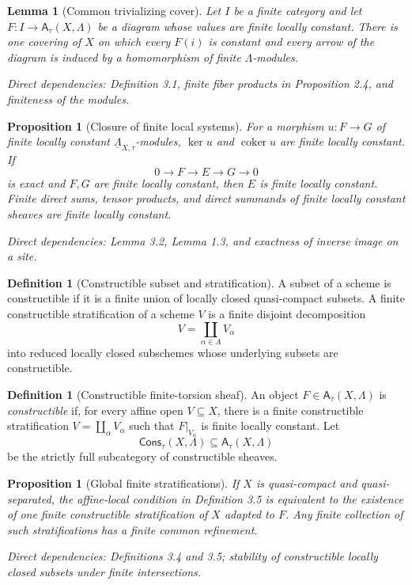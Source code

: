 \documentclass[10pt]{article}
\newtheorem{proposition}[theorem]{Proposition}
\newtheorem{lemma}[theorem]{Lemma}
\theoremstyle{definition}
\newtheorem{definition}[theorem]{Definition}
\newcommand{\Lam}{\Lambda}
\newcommand{\Cons}{\mathsf{Cons}}
\newcommand{\dep}[1]{\par\smallskip\noindent\textit{Direct dependencies: #1}}
\begin{document}
\begin{lemma}[Common trivializing cover]
Let $I$ be a finite category and let $F:I\to\mathsf A_\tau(X,\Lam)$ be a
diagram whose values are finite locally constant.  There is one covering of
$X$ on which every $F(i)$ is constant and every arrow of the diagram is
induced by a homomorphism of finite $\Lam$-modules.
\dep{Definition 3.1, finite fiber products in Proposition 2.4, and finiteness
of the modules.}
\end{lemma}

\begin{proposition}[Closure of finite local systems]
For a morphism $u:F\to G$ of finite locally constant
$\underline\Lam_{X,\tau}$-modules, $\ker u$ and $\operatorname{coker}u$ are
finite locally constant.  If
\[
0\longrightarrow F\longrightarrow E\longrightarrow G\longrightarrow0
\]
is exact and $F,G$ are finite locally constant, then $E$ is finite locally
constant.  Finite direct sums, tensor products, and direct summands of finite
locally constant sheaves are finite locally constant.
\dep{Lemma 3.2, Lemma 1.3, and exactness of inverse image on a site.}
\end{proposition}

\begin{definition}[Constructible subset and stratification]
A subset of a scheme is constructible if it is a finite union of locally
closed quasi-compact subsets.  A finite constructible stratification of a
scheme $V$ is a finite disjoint decomposition
\[
V=\coprod_{\alpha\in A}V_\alpha
\]
into reduced locally closed subschemes whose underlying subsets are
constructible.
\end{definition}

\begin{definition}[Constructible finite-torsion sheaf]
An object $F\in\mathsf A_\tau(X,\Lam)$ is \emph{constructible} if, for every
affine open $V\subseteq X$, there is a finite constructible stratification
$V=\coprod_\alpha V_\alpha$ such that $F|_{V_\alpha}$ is finite locally
constant.  Let
\[
\Cons_\tau(X,\Lam)\subseteq\mathsf A_\tau(X,\Lam)
\]
be the strictly full subcategory of constructible sheaves.
\end{definition}

\begin{proposition}[Global finite stratifications]
If $X$ is quasi-compact and quasi-separated, the affine-local condition in
Definition 3.5 is equivalent to the existence of one finite constructible
stratification of $X$ adapted to $F$.  Any finite collection of such
stratifications has a finite common refinement.
\dep{Definitions 3.4 and 3.5; stability of constructible locally closed subsets
under finite intersections.}
\end{proposition}
\end{document}
